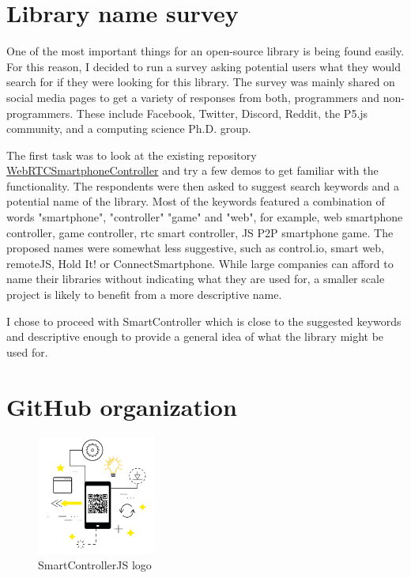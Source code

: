 \documentclass{l4proj}
\begin{document}
\section{Library name survey}
One of the most important things for an open-source library is being found easily. For this reason, I decided to run a survey asking potential users what they would search for if they were looking for this library. The survey was mainly shared on social media pages to get a variety of responses from both, programmers and non-programmers. These include Facebook, Twitter, Discord, Reddit, the P5.js community, and a computing science Ph.D. group. \par
The first task was to look at the existing repository \href{https://github.com/EmmaPoliakova/WebRTCSmartphoneController}{WebRTCSmartphoneController} and try a few demos to get familiar with the functionality. The respondents were then asked to suggest search keywords and a potential name of the library. Most of the keywords featured a combination of words "smartphone", "controller" "game" and "web", for example, web smartphone controller, game controller, rtc smart controller, JS P2P smartphone game. The proposed names were somewhat less suggestive, such as control.io, smart web, remoteJS, Hold It! or ConnectSmartphone. While large companies can afford to name their libraries without indicating what they are used for, a smaller scale project is likely to benefit from a more descriptive name.  \par
I chose to proceed with SmartController which is close to the suggested keywords and descriptive enough to provide a general idea of what the library might be used for. 

\section{GitHub organization}

\begin{figure}
\centering
\includegraphics[width=0.35\textwidth]{./images/logo2.png}
\caption{SmartControllerJS logo}
\label{fig:logo}
\end{figure}
\end{document}
